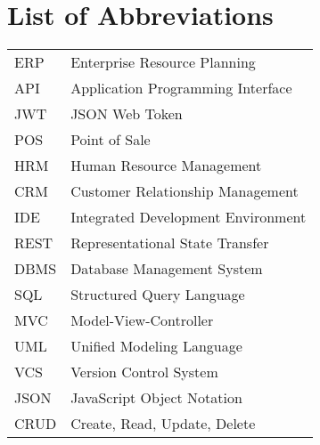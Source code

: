 \chapter*{List of Abbreviations}
\begin{tabular}{ll}
ERP & Enterprise Resource Planning \\
API & Application Programming Interface \\
JWT & JSON Web Token \\
POS & Point of Sale \\
HRM & Human Resource Management \\
CRM & Customer Relationship Management \\
IDE & Integrated Development Environment \\
REST & Representational State Transfer \\
DBMS & Database Management System \\
SQL & Structured Query Language \\
MVC & Model-View-Controller \\
UML & Unified Modeling Language \\
VCS & Version Control System \\
JSON & JavaScript Object Notation \\
CRUD & Create, Read, Update, Delete \\
\end{tabular}
